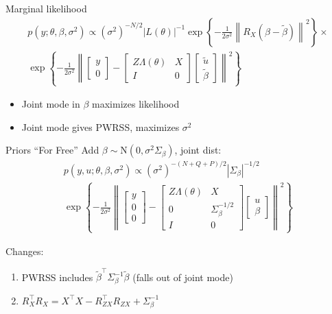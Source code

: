 \documentclass{beamer}
\begin{document}
\begin{frame}{Marginal likelihood}
\begin{multline*}
p(y ; \theta, \beta, \sigma^2) \propto
(\sigma^2)^{-N/2} |L(\theta)|^{-1} \exp\left\{
-\frac{1}{2\sigma^2}\left\|R_X(\beta - \tilde\beta)\right\|^2\right\} \times
\\
\exp\left\{
-\frac{1}{2\sigma^2}\left\|
\begin{bmatrix}
y \\ 0 \end{bmatrix}
-\begin{bmatrix}Z\Lambda(\theta) & X \\
I & 0
\end{bmatrix}
\begin{bmatrix} \tilde{u} \\ \tilde\beta \end{bmatrix} \right\|^2\right\}
\end{multline*}

\begin{itemize}
\item Joint mode in $\beta$ maximizes likelihood
\item Joint mode gives PWRSS, maximizes $\sigma^2$
\end{itemize}

\end{frame}

\begin{frame}{Priors ``For Free''}
Add $\beta \sim \mathrm{N}(0, \sigma^2\Sigma_\beta)$, joint dist:
\vspace{-.1in}
\begin{multline*}
p(y, u; \theta, \beta, \sigma^2) \propto
(\sigma^2)^{-(N + Q + P) / 2}
|\Sigma_\beta|^{-1/2}\\
\exp\left\{
-\frac{1}{2\sigma^2}\left\|
\begin{bmatrix}
y \\ 0 \\ 0\end{bmatrix}
-\begin{bmatrix}Z\Lambda(\theta) & X \\
0 & \Sigma_\beta^{-1/2} \\
I & 0
\end{bmatrix}
\begin{bmatrix} u \\ \beta \end{bmatrix} \right\|^2\right\}
\end{multline*}

Changes:
\begin{enumerate}
\item PWRSS includes $\tilde\beta^\top \Sigma_\beta^{-1}\tilde\beta$ (falls
  out of joint mode)
\item $R_X^\top R_X = X^\top X - R_{ZX}^\top R_{ZX} + \Sigma_\beta^{-1}$
\end{enumerate}

{\pause {}}
\end{frame}
\end{document}
